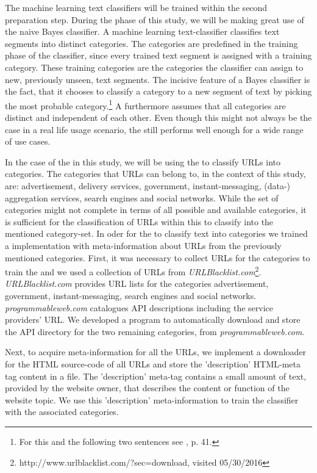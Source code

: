 The machine learning text classifiers will be trained within the second preparation step.
During the \sca phase of this study, we will be making great use of the naive Bayes classifier.
A machine learning text-classifier classifies text segments into distinct categories. 
The categories are predefined in the training phase of the classifier, since every trained text segment is assigned with a training category.
These training categories are the categories the classifier can assign to new, previously unseen, text segments.
The incisive feature of a Bayes classifier is the fact, that it chooses to classify a category to a new segment of text by picking the most probable category.\footnote{For this and the following two sentences see \cite{Rish2001}, p. 41.}
A \nbc furthermore assumes that all categories are distinct and independent of each other. 
Even though this might not always be the case in a real life usage scenario, the \nbc still performs well enough for a wide range of use cases.

In the case of the \sca in this study, we will be using the \nbc to classify URLs into categories.
The categories that URLs can belong to, in the context of this study, are: advertisement, delivery services, government, instant-messaging, (data-) aggregation services, search engines and social networks.
While the set of categories might not complete in terms of all possible and available categories, it is sufficient for the classification of URLs within this \sca to classify into the mentioned category-set.
In oder for the \nbc to classify text into categories we trained a \nbc implementation with meta-information about URLs from the previously mentioned categories.
First, it was necessary to collect URLs for the categories to train the \nbc and we used a collection of \acs{URL}s from \textit{URLBlacklist.com}\footnote{http://www.urlblacklist.com/?sec=download, visited 05/30/2016}.
\textit{URLBlacklist.com} provides URL lists for the categories advertisement, government, instant-messaging, search engines and social networks.
\textit{programmableweb.com} catalogues API descriptions including the service providers' URL.
We developed a program to automatically download and store the API directory for the two remaining categories, from \textit{programmableweb.com}.

Next, to acquire meta-information for all the URLs, we implement a downloader for the HTML source-code of all URLs and store the 'description' HTML-meta tag content in a file.
The 'description' meta-tag contains a small amount of text, provided by the website owner, that describes the content or function of the website topic.
We use this 'description' meta-information to train the classifier with the associated categories.\newline

